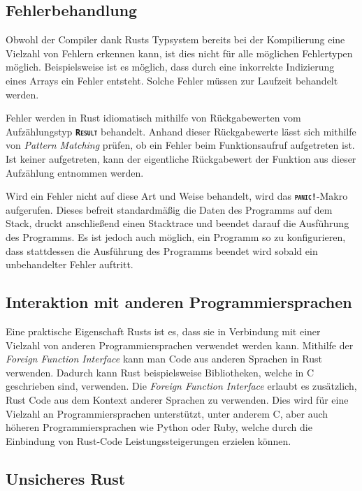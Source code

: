 \subsection{Fehlerbehandlung}\label{sec:error_handling}

Obwohl der Compiler dank Rusts Typsystem bereits bei der Kompilierung eine Vielzahl von Fehlern erkennen kann,
ist dies  nicht für alle möglichen Fehlertypen möglich. Beispielsweise ist es möglich, dass
durch eine inkorrekte Indizierung eines Arrays ein Fehler entsteht.
Solche Fehler müssen zur Laufzeit behandelt werden.\cite{rustBook}

Fehler werden in Rust idiomatisch mithilfe von Rückgabewerten vom Aufzählungstyp \texttt{\textsc{\textbf{Result}}}
behandelt. Anhand dieser Rückgabewerte lässt sich mithilfe von
\textit{Pattern Matching} prüfen, ob ein Fehler beim Funktionsaufruf aufgetreten ist. Ist keiner aufgetreten,
kann der eigentliche Rückgabewert der Funktion aus dieser Aufzählung entnommen werden.
\cite{rustBook}

Wird ein Fehler nicht auf diese Art und Weise behandelt, wird das \texttt{\textsc{\textbf{panic!}}}-Makro
aufgerufen. Dieses befreit standardmäßig die Daten des Programms auf dem Stack, druckt anschließend einen
Stacktrace und beendet darauf die Ausführung des Programms.
Es ist jedoch auch möglich, ein Programm so zu konfigurieren,
dass stattdessen die Ausführung des Programms beendet wird sobald ein unbehandelter Fehler auftritt.\cite{rustBook}

\subsection{Interaktion mit anderen Programmiersprachen}

Eine praktische Eigenschaft Rusts ist es, dass sie in Verbindung mit einer Vielzahl von anderen Programmiersprachen
verwendet werden kann. Mithilfe der \textit{Foreign Function Interface} kann man Code aus anderen
Sprachen in Rust verwenden. Dadurch kann Rust beispielsweise Bibliotheken, welche in C geschrieben sind, verwenden.
Die \textit{Foreign Function Interface} erlaubt es zusätzlich, Rust Code aus dem Kontext anderer Sprachen zu
verwenden. Dies wird für eine Vielzahl an Programmiersprachen unterstützt, unter anderem C, aber auch höheren
Programmiersprachen wie Python oder Ruby, welche durch die Einbindung von Rust-Code Leistungssteigerungen erzielen können.\cite{firstRustBook}\cite{rustBook-1.2.0}

\subsection{Unsicheres Rust}

